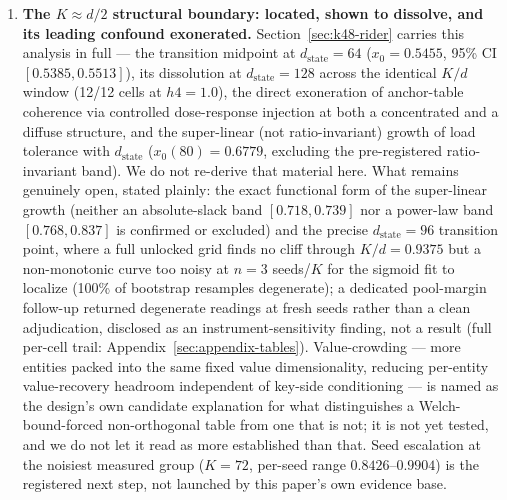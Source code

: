 \begin{enumerate}
\item \textbf{The $K\approx d/2$ structural boundary: located, shown to
dissolve, and its leading confound exonerated.} Section~\ref{sec:k48-rider}
carries this analysis in full --- the transition midpoint at
$d_{\mathrm{state}}{=}64$ ($x_0{=}0.5455$, 95\% CI $[0.5385,0.5513]$),
its dissolution at $d_{\mathrm{state}}{=}128$ across the identical $K/d$
window (12/12 cells at $h4{=}1.0$), the direct exoneration of
anchor-table coherence via controlled dose-response injection at both a
concentrated and a diffuse structure, and the super-linear (not
ratio-invariant) growth of load tolerance with $d_{\mathrm{state}}$
($x_0(80){=}0.6779$, excluding the pre-registered ratio-invariant band).
We do not re-derive that material here. What remains genuinely open,
stated plainly: the exact functional form of the super-linear growth
(neither an absolute-slack band $[0.718,0.739]$ nor a power-law band
$[0.768,0.837]$ is confirmed or excluded) and the precise
$d_{\mathrm{state}}{=}96$ transition point, where a full unlocked grid
finds no cliff through $K/d{=}0.9375$ but a non-monotonic curve too noisy
at $n{=}3$ seeds/$K$ for the sigmoid fit to localize (100\% of bootstrap
resamples degenerate); a dedicated pool-margin follow-up returned
degenerate readings at fresh seeds rather than a clean adjudication,
disclosed as an instrument-sensitivity finding, not a result (full
per-cell trail: Appendix~\ref{sec:appendix-tables}). Value-crowding ---
more entities packed into the same fixed value dimensionality, reducing
per-entity value-recovery headroom independent of key-side conditioning
--- is named as the design's own candidate explanation for what
distinguishes a Welch-bound-forced non-orthogonal table from one that is
not; it is not yet tested, and we do not let it read as more established
than that. Seed escalation at the noisiest measured group ($K{=}72$,
per-seed range $0.8426$--$0.9904$) is the registered next step, not
launched by this paper's own evidence base.


\end{enumerate}
